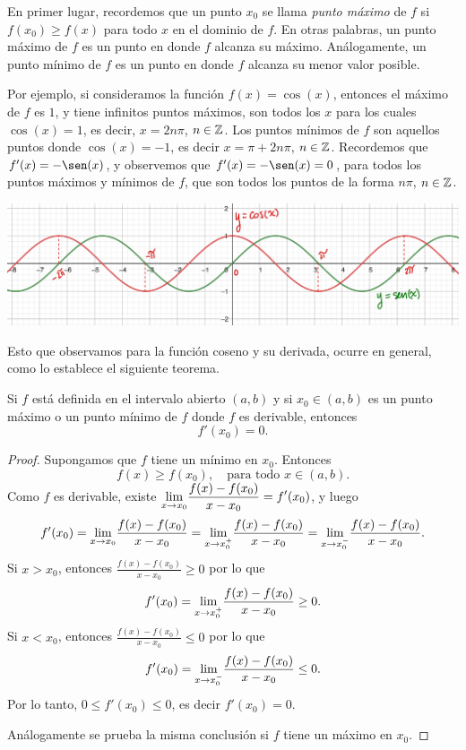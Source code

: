 En primer lugar, recordemos que un punto $x_0$ se llama
\emph{punto máximo} de $f$ si $f(x_0)\ge f(x)$ para todo $x$ en el dominio de $f$.
En otras palabras, un punto máximo de $f$ es un punto en donde $f$ alcanza su máximo. Análogamente, un punto mínimo de $f$ es un punto en donde $f$ alcanza su menor valor posible.

Por ejemplo, si consideramos la función $f(x)=\cos(x)$, entonces el máximo de $f$ es $1$, y tiene infinitos puntos máximos, son todos los $x$ para los cuales $\cos(x)=1$, es decir, $x = 2n\pi$, $n\in\mathbb{Z}$.
Los puntos mínimos de $f$ son aquellos puntos donde $\cos(x)=-1$, es decir $x=\pi+2n\pi$, $n\in\mathbb{Z}$.
Recordemos que $f'(x)=-\sen(x)$, y observemos que $f'(x)=-\sen(x)=0$, para todos los puntos máximos y mínimos de $f$, que son todos los puntos de la forma $n\pi$, $n\in\mathbb{Z}$.

\bigskip
\centerline{\includegraphics[width=.8\textwidth]{pics/seno-coseno.png}}


Esto que observamos para la función coseno y su derivada, ocurre en general, como lo establece el siguiente teorema.

\begin{theorem}
    Si $f$ está definida en el intervalo abierto $(a,b)$ y si $x_0\in(a,b)$ es un punto máximo o un punto mínimo de $f$ donde $f$ es derivable, entonces
    \[
    f'(x_0)=0.
    \]
\end{theorem}

\begin{proof}
    Supongamos que $f$ tiene un mínimo en $x_0$. Entonces
    \[
    f(x)\ge f(x_0), \quad\text{para todo $x\in (a,b)$.}
    \]
    Como $f$ es derivable, existe $\displaystyle{\ensuremath{\lim_{x\to x_0}}} \frac{f(x)-f(x_0)}{x-x_0} = f'(x_0)$, y luego
    \[
    f'(x_0) = {\lim_{x\to x_0}} \frac{f(x)-f(x_0)}{x-x_0} = {\lim_{x\to x_0^+}} \frac{f(x)-f(x_0)}{x-x_0} = {\lim_{x\to x_0^-}} \frac{f(x)-f(x_0)}{x-x_0}.
    \]
    Si $x>x_0$, entonces $\frac{f(x)-f(x_0)}{x-x_0}\ge 0$ por lo que 
    \[
    f'(x_0) = {\lim_{x\to x_0^+}} \frac{f(x)-f(x_0)}{x-x_0} \ge 0.
    \]
    Si $x<x_0$, entonces $\frac{f(x)-f(x_0)}{x-x_0}\le 0$ por lo que 
    \[
    f'(x_0) = {\lim_{x\to x_0^-}} \frac{f(x)-f(x_0)}{x-x_0} \le 0.
    \]
    Por lo tanto, $0 \le f'(x_0) \le 0$, es decir $f'(x_0)=0$.

    Análogamente se prueba la misma conclusión si $f$ tiene un máximo en $x_0$.
\end{proof}

